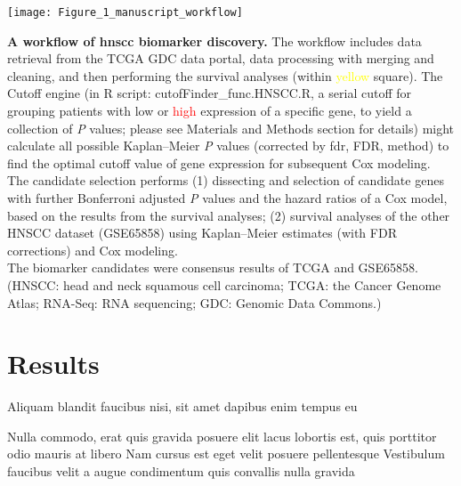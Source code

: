\documentclass[
paper=landscape,
paper=160mm:90mm, %
fontsize=11pt, %
pagesize, %
parskip=half-, %
]{scrartcl} %
\newcommand{\bcaption}[2]{\caption{\textbf{#1} #2}}
\theoremstyle{mythmstyle} %
\begin{document}
\clearpage



\begin{minipage}[c]{0.8\textwidth}
\centering
\texttt{[image: Figure\_1\_manuscript\_workflow]} %
\bcaption{A workflow of \acrshort{hnscc} biomarker discovery.}
{The workflow includes data retrieval from the TCGA GDC data portal, data processing with merging and cleaning, and then performing the survival analyses (within \textcolor{yellow}{yellow} square). The Cutoff engine (in R script: cutofFinder\_func.HNSCC.R, a serial cutoff for grouping patients with \textcolor{asparagus}{low} or \textcolor{red}{high} expression of a specific gene, to yield a collection of \protect\textit{P} values; please see Materials and Methods section for details) might calculate all possible Kaplan--Meier \protect\textit{P} values (corrected by \acrlong{fdr}, FDR, method) to find the optimal cutoff value of gene expression for subsequent Cox modeling.
The candidate selection performs (1) dissecting and selection of candidate genes with further Bonferroni adjusted \protect\textit{P} values and the hazard ratios of a Cox model, based on the results from the survival analyses;
(2) survival analyses of the other HNSCC dataset (GSE65858) using Kaplan--Meier estimates (with FDR corrections) and Cox modeling.\\
The biomarker candidates were consensus results of TCGA and GSE65858. 
(HNSCC: head and neck squamous cell carcinoma; TCGA: the Cancer Genome Atlas; RNA-Seq: RNA sequencing; GDC: Genomic Data Commons.)}

\end{minipage}

\clearpage

\section{Results}


\begin{outline}

\1 Aliquam blandit faucibus nisi, sit amet dapibus enim tempus eu

\2 Nulla commodo, erat quis gravida posuere
\1 elit lacus lobortis est, quis porttitor odio mauris at libero
\1 Nam cursus est eget velit posuere pellentesque
\1 Vestibulum faucibus velit a augue condimentum quis convallis nulla gravida

\end{outline}
\end{document}
